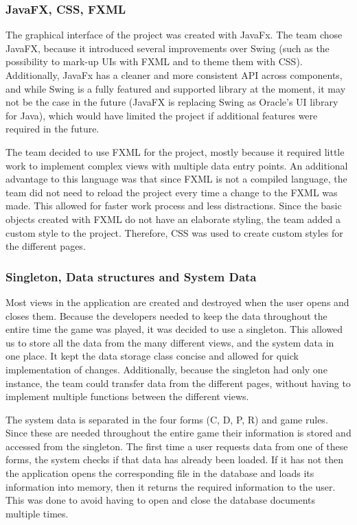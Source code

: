 \documentclass{l3proj}
\begin{document}
\subsubsection{JavaFX, CSS, FXML}
The graphical interface of the project was created with JavaFx. The team chose JavaFX, because it introduced several improvements over Swing (such as the possibility to mark-up UIs with FXML and to theme them with CSS). Additionally, JavaFx has a cleaner and more consistent API across components, and while Swing is a fully featured and supported library at the moment, it may not be the case in the future (JavaFX is replacing Swing as Oracle's UI library for Java), which would have limited the project if additional features were required in the future.

The team decided to use FXML for the project, mostly because it required little work to implement complex views with multiple data entry points. An additional advantage to this language was that since FXML is not a compiled language, the team did not need to reload the project every time a change to the FXML was made. This allowed for faster work process and less distractions. Since the basic objects created with FXML do not have an elaborate styling, the team added a custom style to the project. Therefore, CSS was used to create custom styles for the different pages.

\subsubsection{Singleton, Data structures and System Data}
Most views in the application are created and destroyed when the user opens and closes them. Because the developers needed to keep the data throughout the entire time the game was played, it was decided to use a singleton. This allowed us to store all the data from the many different views, and the system data in one place. It kept the data storage class concise and allowed for quick implementation of changes. Additionally, because the singleton had only one instance, the team could transfer data from the different pages, without having to implement multiple functions between the different views.
 
The system data is separated in the four forms (C, D, P, R) and game rules. Since these are needed throughout the entire game their information is stored and accessed from the singleton. The first time a user requests data from one of these forms, the system checks if that data has already been loaded. If it has not then the application opens the corresponding file in the database and loads its information into memory, then it returns the required information to the user. This was done to avoid having to open and close the database documents multiple times.
\end{document}
